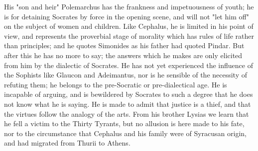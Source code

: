 His "son and heir" Polemarchus has the frankness and impetuousness of youth; he is for detaining Socrates by force in the opening scene, and will not "let him off" on the subject of women and children. Like Cephalus, he is limited in his point of view, and represents the proverbial stage of morality which has rules of life rather than principles; and he quotes Simonides as his father had quoted Pindar. But after this he has no more to say; the answers which he makes are only elicited from him by the dialectic of Socrates. He has not yet experienced the influence of the Sophists like Glaucon and Adeimantus, nor is he sensible of the necessity of refuting them; he belongs to the pre-Socratic or pre-dialectical age. He is incapable of arguing, and is bewildered by Socrates to such a degree that he does not know what he is saying. He is made to admit that justice is a thief, and that the virtues follow the analogy of the arts. From his brother Lysias we learn that he fell a victim to the Thirty Tyrants, but no allusion is here made to his fate, nor to the circumstance that Cephalus and his family were of Syracusan origin, and had migrated from Thurii to Athens.

